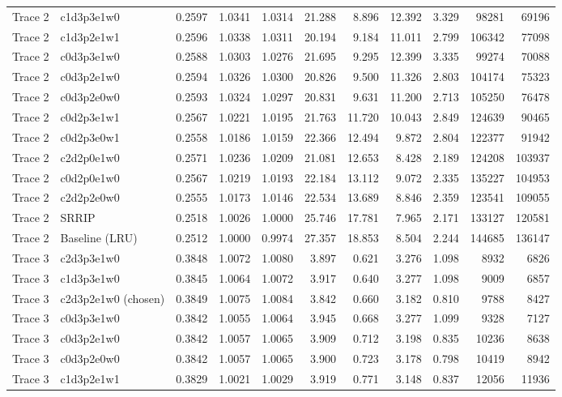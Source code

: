 \begin{table}[H]
{\begin{tabular}{llrrrrrrrrr}
Trace 2 & c1d3p3e1w0 & 0.2597 & 1.0341 & 1.0314 & 21.288 & 8.896 & 12.392 & 3.329 & 98281 & 69196 \\
Trace 2 & c1d3p2e1w1 & 0.2596 & 1.0338 & 1.0311 & 20.194 & 9.184 & 11.011 & 2.799 & 106342 & 77098 \\
Trace 2 & c0d3p3e1w0 & 0.2588 & 1.0303 & 1.0276 & 21.695 & 9.295 & 12.399 & 3.335 & 99274 & 70088 \\
Trace 2 & c0d3p2e1w0 & 0.2594 & 1.0326 & 1.0300 & 20.826 & 9.500 & 11.326 & 2.803 & 104174 & 75323 \\
Trace 2 & c0d3p2e0w0 & 0.2593 & 1.0324 & 1.0297 & 20.831 & 9.631 & 11.200 & 2.713 & 105250 & 76478 \\
Trace 2 & c0d2p3e1w1 & 0.2567 & 1.0221 & 1.0195 & 21.763 & 11.720 & 10.043 & 2.849 & 124639 & 90465 \\
Trace 2 & c0d2p3e0w1 & 0.2558 & 1.0186 & 1.0159 & 22.366 & 12.494 & 9.872 & 2.804 & 122377 & 91942 \\
Trace 2 & c2d2p0e1w0 & 0.2571 & 1.0236 & 1.0209 & 21.081 & 12.653 & 8.428 & 2.189 & 124208 & 103937 \\
Trace 2 & c0d2p0e1w0 & 0.2567 & 1.0219 & 1.0193 & 22.184 & 13.112 & 9.072 & 2.335 & 135227 & 104953 \\
Trace 2 & c2d2p2e0w0 & 0.2555 & 1.0173 & 1.0146 & 22.534 & 13.689 & 8.846 & 2.359 & 123541 & 109055 \\
Trace 2 & SRRIP & 0.2518 & 1.0026 & 1.0000 & 25.746 & 17.781 & 7.965 & 2.171 & 133127 & 120581 \\
Trace 2 & Baseline (LRU) & 0.2512 & 1.0000 & 0.9974 & 27.357 & 18.853 & 8.504 & 2.244 & 144685 & 136147 \\
\midrule
Trace 3 & c2d3p3e1w0 & 0.3848 & 1.0072 & 1.0080 & 3.897 & 0.621 & 3.276 & 1.098 & 8932 & 6826 \\
Trace 3 & c1d3p3e1w0 & 0.3845 & 1.0064 & 1.0072 & 3.917 & 0.640 & 3.277 & 1.098 & 9009 & 6857 \\
Trace 3 & c2d3p2e1w0 (chosen) & 0.3849 & 1.0075 & 1.0084 & 3.842 & 0.660 & 3.182 & 0.810 & 9788 & 8427 \\
Trace 3 & c0d3p3e1w0 & 0.3842 & 1.0055 & 1.0064 & 3.945 & 0.668 & 3.277 & 1.099 & 9328 & 7127 \\
Trace 3 & c0d3p2e1w0 & 0.3842 & 1.0057 & 1.0065 & 3.909 & 0.712 & 3.198 & 0.835 & 10236 & 8638 \\
Trace 3 & c0d3p2e0w0 & 0.3842 & 1.0057 & 1.0065 & 3.900 & 0.723 & 3.178 & 0.798 & 10419 & 8942 \\
Trace 3 & c1d3p2e1w1 & 0.3829 & 1.0021 & 1.0029 & 3.919 & 0.771 & 3.148 & 0.837 & 12056 & 11936 \\

\end{tabular}}
\end{table}
